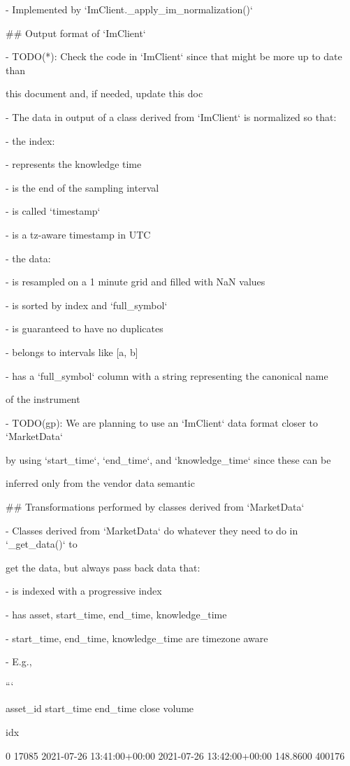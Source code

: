 \documentclass[11pt, reqno]{amsart}
\begin{document}
- Implemented by `ImClient.\_apply\_im\_normalization()`

\#\# Output format of `ImClient`

- TODO(*): Check the code in `ImClient` since that might be more up to
date than

this document and, if needed, update this doc

- The data in output of a class derived from `ImClient` is normalized so
that:

- the index:

- represents the knowledge time

- is the end of the sampling interval

- is called `timestamp`

- is a tz-aware timestamp in UTC

- the data:

- is resampled on a 1 minute grid and filled with NaN values

- is sorted by index and `full\_symbol`

- is guaranteed to have no duplicates

- belongs to intervals like {[}a, b{]}

- has a `full\_symbol` column with a string representing the canonical
name

of the instrument

- TODO(gp): We are planning to use an `ImClient` data format closer to
`MarketData`

by using `start\_time`, `end\_time`, and `knowledge\_time` since these
can be

inferred only from the vendor data semantic

\#\# Transformations performed by classes derived from `MarketData`

- Classes derived from `MarketData` do whatever they need to do in
`\_get\_data()` to

get the data, but always pass back data that:

- is indexed with a progressive index

- has asset, start\_time, end\_time, knowledge\_time

- start\_time, end\_time, knowledge\_time are timezone aware

- E.g.,

```

asset\_id start\_time end\_time close volume

idx

0 17085 2021-07-26 13:41:00+00:00 2021-07-26 13:42:00+00:00 148.8600
400176
\end{document}
